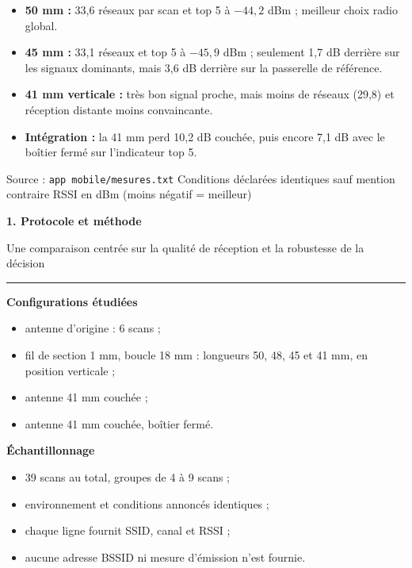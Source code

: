 \documentclass[10pt,a4paper]{article}
\newcommand{\sectiontitle}[2]{%
  {\color{navy}\fontsize{19}{21}\selectfont\bfseries #1}\par
  {\color{muted}\small #2}\par\vspace{4pt}
  {\color{cyan}\rule{19mm}{2pt}}\vspace{5pt}
}
\begin{document}
\vspace{3mm}
\begin{tcolorbox}[colback=paper,colframe=line,boxrule=.5pt,arc=2mm,title={\color{navy}\bfseries Lecture en 30 secondes},fonttitle=\small]
\begin{itemize}
  \item \textbf{50 mm :} 33,6 réseaux par scan et top 5 à \(-44,2\) dBm ; meilleur choix radio global.
  \item \textbf{45 mm :} 33,1 réseaux et top 5 à \(-45,9\) dBm ; seulement 1,7 dB derrière sur les signaux dominants, mais 3,6 dB derrière sur la passerelle de référence.
  \item \textbf{41 mm verticale :} très bon signal proche, mais moins de réseaux (29,8) et réception distante moins convaincante.
  \item \textbf{Intégration :} la 41 mm perd 10,2 dB couchée, puis encore 7,1 dB avec le boîtier fermé sur l'indicateur top 5.
\end{itemize}
\end{tcolorbox}

\vfill
{\color{muted}\small Source : \texttt{app mobile/mesures.txt} \textbullet{} Conditions déclarées identiques sauf mention contraire \textbullet{} RSSI en dBm (moins négatif = meilleur)}
\newpage

\sectiontitle{1. Protocole et méthode}{Une comparaison centrée sur la qualité de réception et la robustesse de la décision}

\begin{minipage}[t]{0.49\textwidth}
\textbf{Configurations étudiées}
\begin{itemize}
  \item antenne d'origine : 6 scans ;
  \item fil de section 1 mm, boucle 18 mm : longueurs 50, 48, 45 et 41 mm, en position verticale ;
  \item antenne 41 mm couchée ;
  \item antenne 41 mm couchée, boîtier fermé.
\end{itemize}
\end{minipage}\hfill
\begin{minipage}[t]{0.49\textwidth}
\textbf{Échantillonnage}
\begin{itemize}
  \item 39 scans au total, groupes de 4 à 9 scans ;
  \item environnement et conditions annoncés identiques ;
  \item chaque ligne fournit SSID, canal et RSSI ;
  \item aucune adresse BSSID ni mesure d'émission n'est fournie.
\end{itemize}
\end{minipage}
\end{document}
